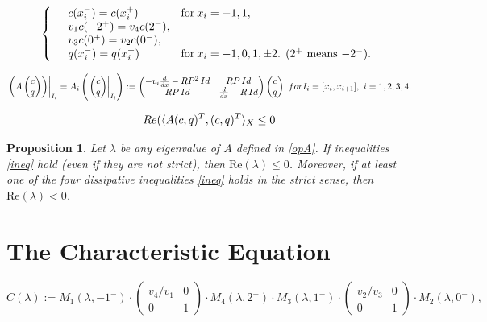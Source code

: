 \documentclass[10pt,a4paper]{amsart}
\newtheorem{prop}{Proposition}
\def\Id{\rm{Id}}
\def\Re{{\textrm{Re}}}
\begin{document}
\begin{equation}\label{bcn0}
\left\{ \begin{array}{lll}
  &c(x_i^-)=c(x_i^+) & \hbox{for}\: x_i=-1,1,\\
  &v_1c(-2^+)=v_4c(2^-),&\\
  &v_3c(0^+)= v_2c(0^-),& \\
  &q(x_i^-)=q(x_i^+) & \hbox{for}\: x_i=-1,0,1,\pm 2 \hbox{. ($2^+$ means $-2^-$)}.
\end{array}\right.
\end{equation}

\begin{equation} \label{opA}
\left.\left(A\begin{pmatrix}c\\q\end{pmatrix}\right)\right|_{I_i}=A_i \left(\left.\begin{pmatrix}c\\q\end{pmatrix}\right|_{I_i}\right):=\begin{pmatrix}
-v_i\frac{d}{dx}-R P^2 \,\Id& RP\, \Id\\RP\, \Id&\frac{d}{dx}-R\, \Id
\end{pmatrix}\begin{pmatrix}c\\q\end{pmatrix}\ \textrm{for }  I_i=[x_i,x_{i+1}],\ i = 1,2,3,4.
\end{equation}

\begin{equation}\label{eq:maxmon}
{\rm Re}(\langle A(c,q)^T, (c,q)^T\rangle_X\le 0
\end{equation}

\begin{prop}\label{prop:Reneg}
Let $\lambda$ be any eigenvalue of $A$ defined in \eqref{opA}. If inequalities \eqref{ineq} hold (even if they are not strict), then $\Re(\lambda)\leq 0$. Moreover, if at least one of the four dissipative inequalities \eqref{ineq} holds in the strict sense, then $\Re(\lambda)<0$.
\end{prop}

\section{The Characteristic Equation}\label{sec:carac}

\begin{equation}\label{eq:C}
C(\lambda):= M_1(\lambda,-1^-)\cdot
\begin{pmatrix} v_4/v_1&0\\0&1\end{pmatrix}\cdot M_4 (\lambda, 2^-)\cdot M_3(\lambda, 1^-)\cdot
\begin{pmatrix} v_2/v_3&0\\0&1\end{pmatrix}\cdot M_2 (\lambda,0^-),
\end{equation}
\end{document}
